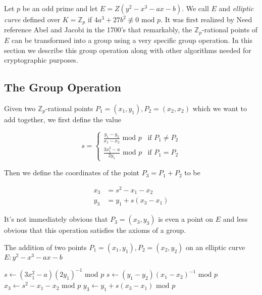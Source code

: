 

Let $p$ be an odd prime and let $E = Z( y^2 - x^3 - ax - b)$. We call $E$ and \textit{elliptic curve} defined over $K = \mathbb{Z}_p$ if $4a^3 + 27b^2 \not\equiv 0 \text{ mod } p$. It was first realized by {\color{red}Need reference} Abel and Jacobi in the 1700's that remarkably, the $\mathbb{Z}_p$-rational points of $E$ can be transformed into a group using a very specific group operation. In this section we describe this group operation along with other algorithms needed for cryptographic purposes. 

\subsection{The Group Operation}  

Given two $\mathbb{Z}_p$-rational points $P_1 = (x_1,y_1),P_2=(x_2,x_2)$ which we want to add together, we first define the value 

$$ s =
\begin{cases}
\frac{y_1 - y_2}{x_1 - x_2} \text{ mod } p 	&\text{if } P_1 \neq P_2 \\
\frac{3x_1^2 - a}{2y_1} 	\text{ mod } p	&\text{if } P_1 = P_2 
\end{cases} 
$$ 

Then we define the coordinates of the point $P_3 = P_1 + P_2 $ to be 

\begin{align*}
	x_3 &= s^2 - x_1 - x_2  \\ 
	y_3 &= y_1 + s(x_3 - x_1) 
\end{align*}

It's not immediately obvious that $P_3 = (x_3,y_3)$ is even a point on $E$ and less obvious that this operation satisfies the axioms of a group.  \\

\begin{algorithm} 
	\caption{The addition of two points $P_1 = (x_1,y_1),P_2 = (x_2,y_2)$ on an elliptic curve $E : y^2 - x^3 - ax - b$}
	\begin{algorithmic}[1]
				\State {}
				\State {}
				\State $ s \leftarrow (3x_1^2 - a)(2y_1)^{-1} \text { mod } p $
		  	\Else
	  				\State $ s \leftarrow (y_1 - y_2)(x_1 - x_2)^{-1} \text{ mod }p $
	  			\Else
	  				\State {}
	  			\EndIf
	  		\EndIf 
	  		\State $ x_3 \leftarrow s^2 - x_1 -x_2 \text{ mod } p $
	  		\State $ y_3 \leftarrow  y_1 + s(x_3 - x_1) \text{ mod } p $ 
	  		\State {}
	  	\EndFunction
	\end{algorithmic} 
\end{algorithm} 

